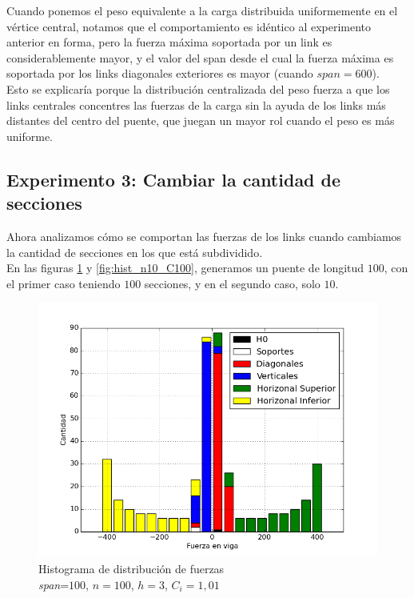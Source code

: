 Cuando ponemos el peso equivalente a la carga distribuida uniformemente en el 
vértice central, notamos que el comportamiento es idéntico al experimento 
anterior en forma, pero la fuerza máxima soportada por un link es considerablemente mayor, y el valor del span desde el cual la fuerza máxima es soportada por los links diagonales exteriores es mayor (cuando $span = 600$).\\

Esto se explicaría porque la distribución centralizada del peso fuerza a que los links centrales concentres las fuerzas de la carga sin la ayuda de los links más distantes del centro del puente, que juegan un mayor rol cuando el peso es más uniforme.

\newpage 
\subsection{Experimento 3: Cambiar la cantidad de secciones}

Ahora analizamos cómo se comportan las fuerzas de los links cuando cambiamos la cantidad de secciones en los que está subdividido.\\

En las figuras \ref{fig:hist_n100_C100} y \ref{fig:hist_n10_C100}, generamos un puente de longitud $100$, con el primer caso teniendo $100$ secciones, y en el segundo caso, solo $10$.

\begin{figure}[h!]
\begin{center}
\includegraphics[scale=0.5]{archivos/graficos/hist_n100_C100.png}
\caption{\label{fig:hist_n100_C100}Histograma de distribución de fuerzas\\
\textit{span}=$100$, $n=100$, $h=3$, $C_i=1,01$}
\end{center}
\end{figure}

